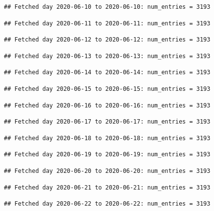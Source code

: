\documentclass[]{article}
\begin{document}
\begin{verbatim}
## Fetched day 2020-06-10 to 2020-06-10: num_entries = 3193
\end{verbatim}

\begin{verbatim}
## Fetched day 2020-06-11 to 2020-06-11: num_entries = 3193
\end{verbatim}

\begin{verbatim}
## Fetched day 2020-06-12 to 2020-06-12: num_entries = 3193
\end{verbatim}

\begin{verbatim}
## Fetched day 2020-06-13 to 2020-06-13: num_entries = 3193
\end{verbatim}

\begin{verbatim}
## Fetched day 2020-06-14 to 2020-06-14: num_entries = 3193
\end{verbatim}

\begin{verbatim}
## Fetched day 2020-06-15 to 2020-06-15: num_entries = 3193
\end{verbatim}

\begin{verbatim}
## Fetched day 2020-06-16 to 2020-06-16: num_entries = 3193
\end{verbatim}

\begin{verbatim}
## Fetched day 2020-06-17 to 2020-06-17: num_entries = 3193
\end{verbatim}

\begin{verbatim}
## Fetched day 2020-06-18 to 2020-06-18: num_entries = 3193
\end{verbatim}

\begin{verbatim}
## Fetched day 2020-06-19 to 2020-06-19: num_entries = 3193
\end{verbatim}

\begin{verbatim}
## Fetched day 2020-06-20 to 2020-06-20: num_entries = 3193
\end{verbatim}

\begin{verbatim}
## Fetched day 2020-06-21 to 2020-06-21: num_entries = 3193
\end{verbatim}

\begin{verbatim}
## Fetched day 2020-06-22 to 2020-06-22: num_entries = 3193
\end{verbatim}
\end{document}
